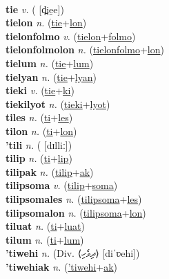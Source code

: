  \label{ti} \\
\textbf{tie} \textit{v.} ( [d̪ie̯e])
 \label{tie} \\
\textbf{tielon} \textit{n.} (\hyperref[tie]{tie}+\hyperref[lon]{lon})
 \label{tielon} \\
\textbf{tielonfolmo} \textit{v.} (\hyperref[tielon]{tielon}+\hyperref[folmo]{folmo})
 \label{tielonfolmo} \\
\textbf{tielonfolmolon} \textit{n.} (\hyperref[tielonfolmo]{tielonfolmo}+\hyperref[lon]{lon})
 \label{tielonfolmolon} \\
\textbf{tielum} \textit{n.} (\hyperref[tie]{tie}+\hyperref[lum]{lum})
 \label{tielum} \\
\textbf{tielyan} \textit{n.} (\hyperref[tie]{tie}+\hyperref[lyan]{lyan})
 \label{tielyan} \\
\textbf{tieki} \textit{v.} (\hyperref[tie]{tie}+\hyperref[ki]{ki})
 \label{tieki} \\
\textbf{tiekilyot} \textit{n.} (\hyperref[tieki]{tieki}+\hyperref[lyot]{lyot})
 \label{tiekilyot} \\
\textbf{tiles} \textit{n.} (\hyperref[ti]{ti}+\hyperref[les]{les})
 \label{tiles} \\
\textbf{tilon} \textit{n.} (\hyperref[ti]{ti}+\hyperref[lon]{lon})
 \label{tilon} \\
\textbf{'tili} \textit{n.} ( [dɪlliː])
 \label{'tili} \\
\textbf{tilip} \textit{n.} (\hyperref[ti]{ti}+\hyperref[lip]{lip})
 \label{tilip} \\
\textbf{tilipak} \textit{n.} (\hyperref[tilip]{tilip}+\hyperref[ak]{ak})
 \label{tilipak} \\
\textbf{tilipsoma} \textit{v.} (\hyperref[tilip]{tilip}+\hyperref[soma]{soma})
 \label{tilipsoma} \\
\textbf{tilipsomales} \textit{n.} (\hyperref[tilipsoma]{tilipsoma}+\hyperref[les]{les})
 \label{tilipsomales} \\
\textbf{tilipsomalon} \textit{n.} (\hyperref[tilipsoma]{tilipsoma}+\hyperref[lon]{lon})
 \label{tilipsomalon} \\
\textbf{tiluat} \textit{n.} (\hyperref[ti]{ti}+\hyperref[luat]{luat})
 \label{tiluat} \\
\textbf{tilum} \textit{n.} (\hyperref[ti]{ti}+\hyperref[lum]{lum})
 \label{tilum} \\
\textbf{'tiwehi} \textit{n.} (Div. ⟨ދިވެހި⟩ [diˈʋehi])
 \label{'tiwehi} \\
\textbf{'tiwehiak} \textit{n.} (\hyperref['tiwehi]{'tiwehi}+\hyperref[ak]{ak})
